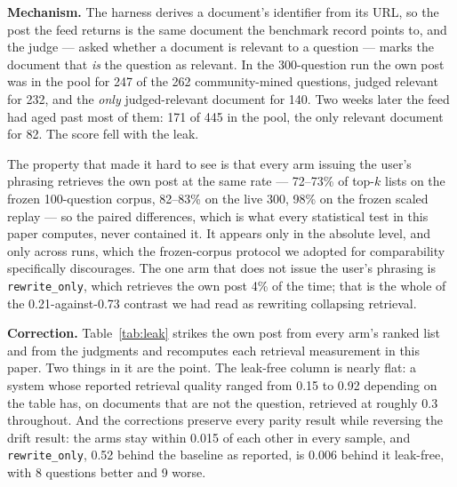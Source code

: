 \documentclass[10pt,conference]{IEEEtran}
\begin{document}
\textbf{Mechanism.} The harness derives a document's identifier from its URL, so
the post the feed returns is the same document the benchmark record points to,
and the judge --- asked whether a document is relevant to a question --- marks
the document that \emph{is} the question as relevant. In the 300-question run
the own post was in the pool for 247 of the 262 community-mined questions,
judged relevant for 232, and the \emph{only} judged-relevant document for 140.
Two weeks later the feed had aged past most of them: 171 of 445 in the pool, the
only relevant document for 82. The score fell with the leak.

The property that made it hard to see is that every arm issuing the user's
phrasing retrieves the own post at the same rate --- 72--73\% of top-$k$ lists on
the frozen 100-question corpus, 82--83\% on the live 300, 98\% on the frozen
scaled replay --- so the paired differences, which is what every statistical test
in this paper computes, never contained it. It appears only in the absolute level,
and only across runs, which the frozen-corpus protocol we adopted for
comparability specifically discourages. The one arm that does not issue the user's
phrasing is \texttt{rewrite\_only}, which retrieves the own post 4\% of the time;
that is the whole of the 0.21-against-0.73 contrast we had read as rewriting
collapsing retrieval.

\textbf{Correction.} Table~\ref{tab:leak} strikes the own post from every arm's
ranked list and from the judgments and recomputes each retrieval measurement in
this paper. Two things in it are the point. The leak-free column is nearly flat:
a system whose reported retrieval quality ranged from 0.15 to 0.92 depending on
the table has, on documents that are not the question, retrieved at roughly 0.3
throughout. And the corrections preserve every parity result while reversing the
drift result: the arms stay within 0.015 of each other in every sample, and
\texttt{rewrite\_only}, 0.52 behind the baseline as reported, is 0.006 behind it
leak-free, with 8 questions better and 9 worse.
\end{document}
